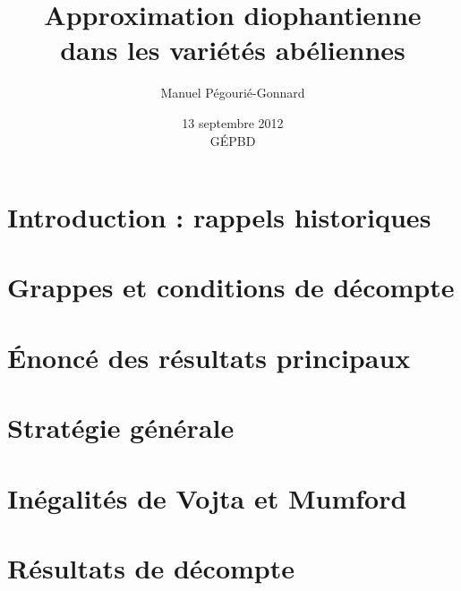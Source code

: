 \documentclass{mpg-thslides}
\author[MPG]{Manuel Pégourié-Gonnard}
\institute[UPMC]{Université Pierre et Marie Curie}
\title{Approximation diophantienne \\ dans les variétés abéliennes}
\date{13 septembre 2012 \\ GÉPBD}
\begin{document}
\maketitle

\frame{\tableofcontents}

\section[Intro]{Introduction : rappels historiques}
\frame{\tableofcontents[currentsection]}

\section[Grappes]{Grappes et conditions de décompte}
\frame{\tableofcontents[currentsection]}

\section[Résultats]{Énoncé des résultats principaux}
\frame{\tableofcontents[currentsection]}

\section[Stratégie]{Stratégie générale}
\frame{\tableofcontents[currentsection]}

\section[Inégalités]{Inégalités de Vojta et Mumford}
\frame{\tableofcontents[currentsection]}

\section[Décomptes]{Résultats de décompte}
\frame{\tableofcontents[currentsection]}
\end{document}
